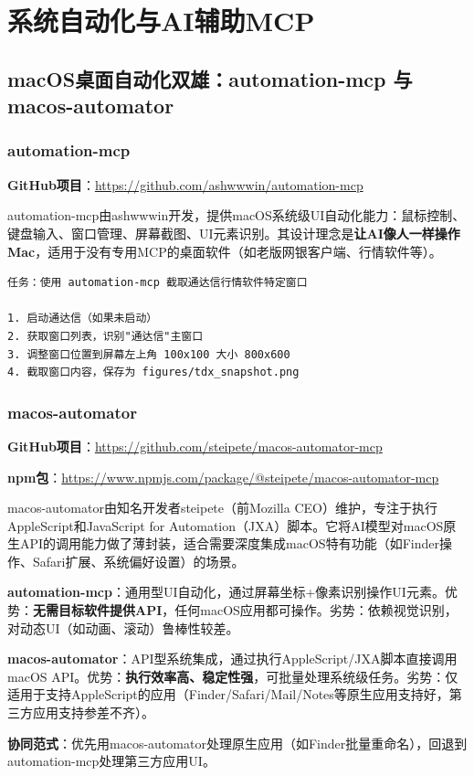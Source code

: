 \section{系统自动化与AI辅助MCP}

\subsection{macOS桌面自动化双雄：automation-mcp 与 macos-automator}

\subsubsection{automation-mcp}

\textbf{GitHub项目}：\url{https://github.com/ashwwwin/automation-mcp}

automation-mcp由ashwwwin开发，提供macOS系统级UI自动化能力：鼠标控制、键盘输入、窗口管理、屏幕截图、UI元素识别。其设计理念是\textbf{让AI像人一样操作Mac}，适用于没有专用MCP的桌面软件（如老版网银客户端、行情软件等）。

\begin{lstlisting}
任务：使用 automation-mcp 截取通达信行情软件特定窗口

1. 启动通达信（如果未启动）
2. 获取窗口列表，识别"通达信"主窗口
3. 调整窗口位置到屏幕左上角 100x100 大小 800x600
4. 截取窗口内容，保存为 figures/tdx_snapshot.png
\end{lstlisting}

\subsubsection{macos-automator}

\textbf{GitHub项目}：\url{https://github.com/steipete/macos-automator-mcp}

\textbf{npm包}：\url{https://www.npmjs.com/package/@steipete/macos-automator-mcp}

macos-automator由知名开发者steipete（前Mozilla CEO）维护，专注于执行AppleScript和JavaScript for Automation（JXA）脚本。它将AI模型对macOS原生API的调用能力做了薄封装，适合需要深度集成macOS特有功能（如Finder操作、Safari扩展、系统偏好设置）的场景。

\begin{theorybox}
\textbf{automation-mcp}：通用型UI自动化，通过屏幕坐标+像素识别操作UI元素。优势：\textbf{无需目标软件提供API}，任何macOS应用都可操作。劣势：依赖视觉识别，对动态UI（如动画、滚动）鲁棒性较差。

\textbf{macos-automator}：API型系统集成，通过执行AppleScript/JXA脚本直接调用macOS API。优势：\textbf{执行效率高、稳定性强}，可批量处理系统级任务。劣势：仅适用于支持AppleScript的应用（Finder/Safari/Mail/Notes等原生应用支持好，第三方应用支持参差不齐）。

\textbf{协同范式}：优先用macos-automator处理原生应用（如Finder批量重命名），回退到automation-mcp处理第三方应用UI。
\end{theorybox}

